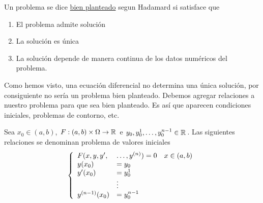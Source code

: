  \begin{definicion}\label{defi:had}
 Un problema se dice \link \href{http://es.wikipedia.org/wiki/Problema_bien_definido}{bien planteado} segun Hadamard si satisface que

 \begin{enumerate}
  \item\label{it:had1} El problema admite solución
  \item\label{it:had2} La solución es única
  \item\label{it:had3} La solución depende de manera continua de los datos numéricos del problema.
 \end{enumerate}
\end{definicion}
 Como hemos visto, una ecuación diferencial no determina una única solución, por consiguiente no sería un problema bien planteado. Debemos agregar relaciones
a nuestro problema para que sea bien planteado. Es así que aparecen condiciones iniciales, problemas de contorno, etc.




\begin{definicion} Sea $x_0\in(a,b)$, $F:(a,b)\times \Omega\to\rr$ e $y_0,y_0^1,\ldots,y_0^{n-1}\in\rr$. Las siguientes relaciones  se denominan problema de
valores iniciales
\begin{equation}
 \left\{\begin{array}{l l l}
         F(x,y,y',&\ldots,y^{(n)})=0& x\in(a,b)\\
         y(x_0)&=y_0&\\
         y'(x_0)&=y_0^1&\\
          & \vdots &\\
          y^{(n-1)}(x_0)&=y_0^{n-1}&\\
        \end{array}
   \right.
\end{equation}\label{eq:pvi}

\end{definicion}

